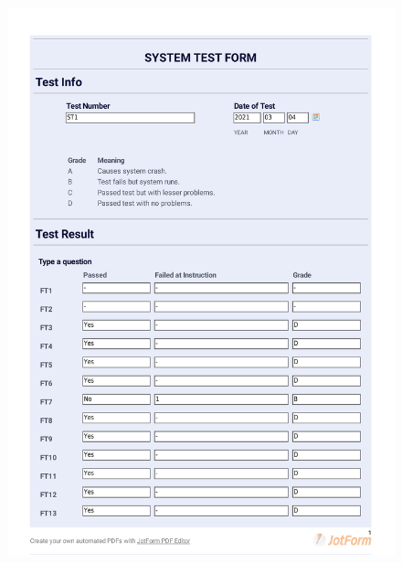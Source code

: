 \documentclass{article}
\begin{document}
\begin{figure}
     \centering
     \includegraphics[width=13cm]{images/2021-03-04_Alexander_ST1-1}
     \renewcommand\figurename{Figure}
     \label{fig:my_label}
 \end{figure}
 
\end{document}
